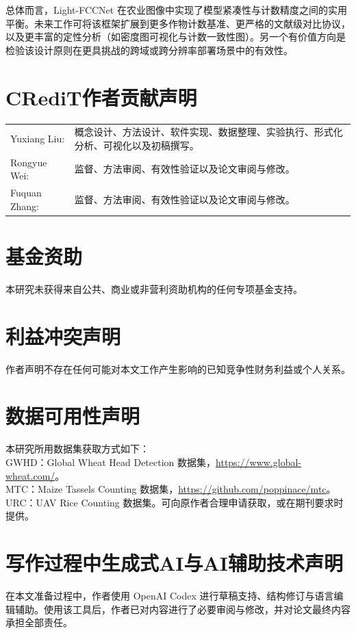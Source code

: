 \documentclass[a4paper,fleqn]{cas-sc}
\begin{document}
总体而言，Light-FCCNet 在农业图像中实现了模型紧凑性与计数精度之间的实用平衡。未来工作可将该框架扩展到更多作物计数基准、更严格的文献级对比协议，以及更丰富的定性分析（如密度图可视化与计数一致性图）。另一个有价值方向是检验该设计原则在更具挑战的跨域或跨分辨率部署场景中的有效性。

\section*{CRediT作者贡献声明}
\noindent
\begin{tabularx}{\linewidth}{@{}p{3cm}X@{}}
    Yuxiang Liu: & 概念设计、方法设计、软件实现、数据整理、实验执行、形式化分析、可视化以及初稿撰写。 \\
    Rongyue Wei: & 监督、方法审阅、有效性验证以及论文审阅与修改。 \\
    Fuquan Zhang: & 监督、方法审阅、有效性验证以及论文审阅与修改。 \\
\end{tabularx}

\section*{基金资助}
\noindent 本研究未获得来自公共、商业或非营利资助机构的任何专项基金支持。

\section*{利益冲突声明}
\noindent 作者声明不存在任何可能对本文工作产生影响的已知竞争性财务利益或个人关系。

\section*{数据可用性声明}
\noindent 本研究所用数据集获取方式如下：\\
GWHD：Global Wheat Head Detection 数据集，\url{https://www.global-wheat.com/}。\\
MTC：Maize Tassels Counting 数据集，\url{https://github.com/poppinace/mtc}。\\
URC：UAV Rice Counting 数据集。可向原作者合理申请获取，或在期刊要求时提供。

\section*{写作过程中生成式AI与AI辅助技术声明}
\noindent 在本文准备过程中，作者使用 OpenAI Codex 进行草稿支持、结构修订与语言编辑辅助。使用该工具后，作者已对内容进行了必要审阅与修改，并对论文最终内容承担全部责任。



\end{document}
